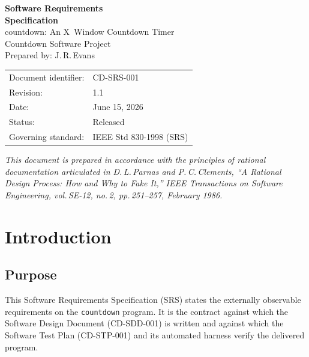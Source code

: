 \documentclass[12pt]{article}
\newcommand{\code}[1]{\texttt{#1}}
\begin{document}
\begin{titlepage}
  \centering
  \vspace*{2cm}
  {\Huge\bfseries\color{cdteal} Software Requirements\\ Specification\\[0.5em]}
  {\Large countdown: An X~Window Countdown Timer}\\[2em]
  {\large Countdown Software Project}\\[0.5em]
  {\normalsize Prepared by: J.\,R.\,Evans}\\[2em]
  \begin{tabular}{ll}
    Document identifier: & CD-SRS-001                                     \\
    Revision:            & 1.1                                            \\
    Date:                & June 15, 2026                                  \\
    Status:              & Released                                       \\
    Governing standard:  & IEEE Std 830-1998 (SRS)                        \\
  \end{tabular}
  \vfill
  {\small\textit{This document is prepared in accordance with the
  principles of rational documentation articulated in
  D.\,L.\,Parnas and P.\,C.\,Clements, ``A Rational Design Process:
  How and Why to Fake It,'' \textit{IEEE Transactions on Software
  Engineering}, vol.\,SE-12, no.\,2, pp.\,251--257, February 1986.}}
\end{titlepage}

\tableofcontents
\clearpage

\section{Introduction}

\subsection{Purpose}

This Software Requirements Specification (SRS) states the externally
observable requirements on the \code{countdown} program.  It is the
contract against which the Software Design Document (CD-SDD-001) is
written and against which the Software Test Plan (CD-STP-001) and its
automated harness verify the delivered program.
\end{document}
